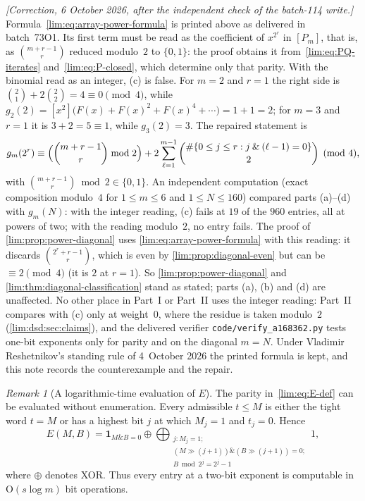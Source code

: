 \documentclass[11pt]{article}
\theoremstyle{definition}
\theoremstyle{remark}
\newtheorem{remark}[theorem]{Remark}
\newcommand{\band}{\mathbin{\&}}
\newcommand{\ind}{\mathbf 1}
\newcommand{\Oh}{\mathrm O}
\begin{document}
\emph{[Correction, 6 October 2026, after the independent check of the
batch-114 write.]} Formula~\eqref{lim:eq:array-power-formula} is printed
above as delivered in batch~73O1. Its first term must be read as the
coefficient of $x^{2^r}$ in $[P_m]$, that is, as $\binom{m+r-1}{r}$ reduced
modulo~$2$ to $\{0,1\}$: the proof obtains it from~\eqref{lim:eq:PQ-iterates}
and~\eqref{lim:eq:P-closed}, which determine only that parity. With the
binomial read as an integer, (c) is false. For $m=2$ and $r=1$ the right side
is $\binom21+2\binom22=4\equiv0\pmod4$, while
$g_2(2)=[x^2]\bigl(F(x)+F(x)^2+F(x)^4+\cdots\bigr)=1+1=2$; for $m=3$ and
$r=1$ it is $3+2=5\equiv1$, while $g_3(2)=3$. The repaired statement is
\[
 g_m(2^r)\equiv
 \Bigl(\binom{m+r-1}{r}\bmod2\Bigr)
 +2\sum_{\ell=1}^{m-1}
     \binom{\#\{0\le j\le r:j\band(\ell-1)=0\}}2
 \pmod4,
\]
with $\binom{m+r-1}{r}\bmod2\in\{0,1\}$. An independent computation (exact
composition modulo~$4$ for $1\le m\le6$ and $1\le N\le160$) compared parts
(a)--(d) with $g_m(N)$: with the integer reading, (c) fails at $19$ of the
$960$ entries, all at powers of two; with the reading modulo~$2$, no entry
fails. The proof of \cref{lim:prop:power-diagonal} uses
\eqref{lim:eq:array-power-formula} with this reading: it discards
$\binom{2^r+r-1}{r}$, which is even by \cref{lim:prop:diagonal-even} but
can be $\equiv2\pmod4$ (it is $2$ at $r=1$). So
\cref{lim:prop:power-diagonal} and \cref{lim:thm:diagonal-classification}
stand as stated; parts (a), (b) and (d) are unaffected. No other place in
Part~I or Part~II uses the integer reading: Part~II compares with (c) only
at weight~$0$, where the residue is taken modulo~$2$
(\cref{lim:dsd:sec:claims}), and the delivered verifier
\texttt{code/verify\_a168362.py} tests one-bit exponents only for parity
and on the diagonal $m=N$. Under Vladimir Reshetnikov's standing rule of
4~October 2026 the printed formula is kept, and this note records the
counterexample and the repair.

\begin{remark}[A logarithmic-time evaluation of $E$]
\label{lim:rem:E-fast}
The parity in~\eqref{lim:eq:E-def} can be evaluated without enumeration.  Every
admissible $t\le M$ is either the tight word $t=M$ or has a highest bit $j$ at
which $M_j=1$ and $t_j=0$.  Hence
\begin{equation}\label{lim:eq:E-first-difference}
 E(M,B)=\ind_{M\band B=0}
 \mathbin{\oplus}
 \bigoplus_{\substack{j:M_j=1;\\
   (M\gg(j+1))\band(B\gg(j+1))=0;\\
   B\bmod2^j=2^j-1}}1,
\end{equation}
where $\oplus$ denotes XOR.  Thus every entry at a two-bit exponent is
computable in $\Oh(s\log m)$ bit operations.
\end{remark}
\end{document}
